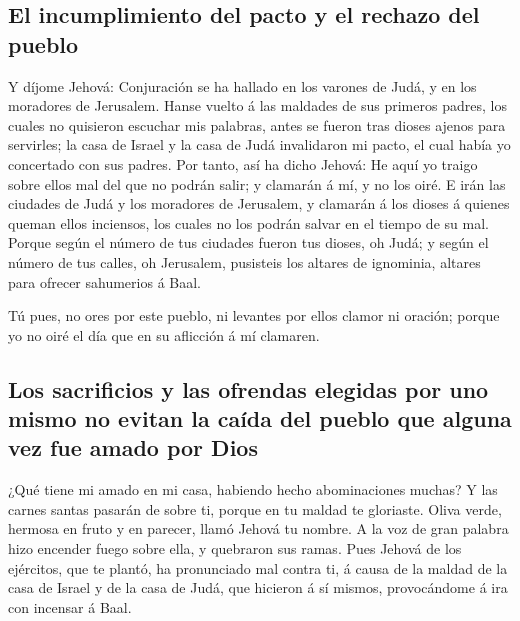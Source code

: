 \hypertarget{el-incumplimiento-del-pacto-y-el-rechazo-del-pueblo}{%
\subsection{El incumplimiento del pacto y el rechazo del
pueblo}\label{el-incumplimiento-del-pacto-y-el-rechazo-del-pueblo}}

 Y díjome Jehová: Conjuración se ha hallado en los varones
de Judá, y en los moradores de Jerusalem.  Hanse vuelto á
las maldades de sus primeros padres, los cuales no quisieron escuchar
mis palabras, antes se fueron tras dioses ajenos para servirles; la casa
de Israel y la casa de Judá invalidaron mi pacto, el cual había yo
concertado con sus padres.  Por tanto, así ha dicho
Jehová: He aquí yo traigo sobre ellos mal del que no podrán salir; y
clamarán á mí, y no los oiré.  E irán las ciudades de
Judá y los moradores de Jerusalem, y clamarán á los dioses á quienes
queman ellos inciensos, los cuales no los podrán salvar en el tiempo de
su mal.  Porque según el número de tus ciudades fueron
tus dioses, oh Judá; y según el número de tus calles, oh Jerusalem,
pusisteis los altares de ignominia, altares para ofrecer sahumerios á
Baal.

 Tú pues, no ores por este pueblo, ni levantes por ellos
clamor ni oración; porque yo no oiré el día que en su aflicción á mí
clamaren.

\hypertarget{los-sacrificios-y-las-ofrendas-elegidas-por-uno-mismo-no-evitan-la-cauxedda-del-pueblo-que-alguna-vez-fue-amado-por-dios}{%
\subsection{Los sacrificios y las ofrendas elegidas por uno mismo no
evitan la caída del pueblo que alguna vez fue amado por
Dios}\label{los-sacrificios-y-las-ofrendas-elegidas-por-uno-mismo-no-evitan-la-cauxedda-del-pueblo-que-alguna-vez-fue-amado-por-dios}}

 ¿Qué tiene mi amado en mi casa, habiendo hecho
abominaciones muchas? Y las carnes santas pasarán de sobre ti, porque en
tu maldad te gloriaste.  Oliva verde, hermosa en fruto y
en parecer, llamó Jehová tu nombre. A la voz de gran palabra hizo
encender fuego sobre ella, y quebraron sus ramas.  Pues
Jehová de los ejércitos, que te plantó, ha pronunciado mal contra ti, á
causa de la maldad de la casa de Israel y de la casa de Judá, que
hicieron á sí mismos, provocándome á ira con incensar á Baal.

